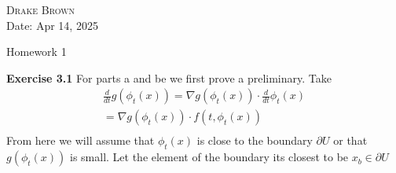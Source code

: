 \documentclass[12pt]{article}
\newenvironment{exercise}[1]{\vspace{.1in}\noindent\textbf{Exercise #1 \hspace{.05em}}}{}
\theoremstyle{definition}
\theoremstyle{remark}
\begin{document}
\begin{flushright}
	\textsc{Drake Brown}  \\
	Date: Apr 14, 2025
\end{flushright}
\begin{center}
	Homework 1
\end{center}


\begin{exercise}{3.1}
	For parts a and be we first prove a preliminary. Take
	\begin{align}
		\frac{d}{dt}g(\phi_t(x))=\nabla g(\phi_t(x))\cdot \frac{d}{dt}\phi_t(x) \\
		=\nabla g(\phi_t(x))\cdot f(t,\phi_t(x))                                \\
	\end{align}
	From here we will assume that $\phi_t(x)$ is close to the boundary $\partial U$ or that $g(\phi_t(x))$ is small. Let the element of the boundary its closest to be $x_b\in \partial U$



\end{exercise}
\end{document}
